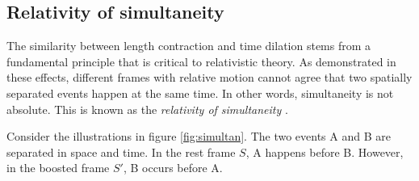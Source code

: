 \documentclass[a4paper]{article}
\begin{document}







\subsection{Relativity of simultaneity}
The similarity between length contraction and time dilation stems from a fundamental principle that is critical to relativistic theory. As demonstrated in these effects, different frames with relative motion cannot agree that two spatially separated events happen at the same time. In other words, simultaneity is not absolute. This is known as the \textit{relativity of simultaneity} \cite{rindler}.

Consider the illustrations in figure \ref{fig:simultan}. The two events A and B are separated in space and time. In the rest frame $S$, A happens before B. However, in the boosted frame $S'$, B occurs before A.
\end{document}
